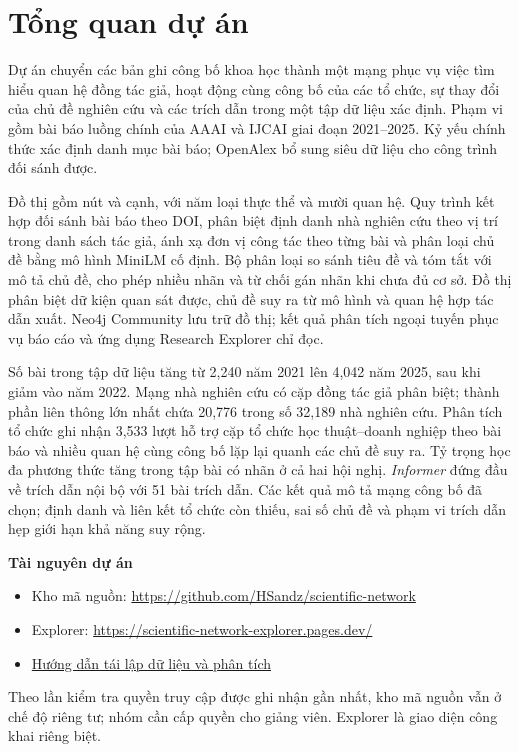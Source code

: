 \chapter*{Tổng quan dự án}
Dự án chuyển các bản ghi công bố khoa học thành một mạng phục vụ việc tìm hiểu
quan hệ đồng tác giả, hoạt động cùng công bố của các tổ chức, sự thay đổi của
chủ đề nghiên cứu và các trích dẫn trong một tập dữ liệu xác định. Phạm vi gồm
\Papers{} bài báo luồng chính của AAAI và IJCAI giai đoạn 2021--2025. Kỷ yếu
chính thức xác định danh mục bài báo; OpenAlex bổ sung siêu dữ liệu cho
\MatchedWorks{} công trình đối sánh được.

Đồ thị gồm \TotalNodes{} nút và
\TotalEdges{} cạnh, với năm loại thực thể và mười quan hệ. Quy trình kết hợp
đối sánh bài báo theo DOI, phân biệt định danh nhà nghiên cứu theo vị trí trong
danh sách tác giả, ánh xạ đơn vị công tác theo từng bài và phân loại chủ đề bằng
mô hình MiniLM cố định. Bộ phân loại so sánh tiêu đề và tóm tắt với mô tả chủ đề,
cho phép nhiều nhãn và từ chối gán nhãn khi chưa đủ cơ sở. Đồ thị phân biệt dữ
kiện quan sát được, chủ đề suy ra từ mô hình và quan hệ hợp tác dẫn xuất. Neo4j
Community lưu trữ đồ thị; kết quả phân tích ngoại tuyến phục vụ báo cáo và ứng
dụng Research Explorer chỉ đọc.

Số bài trong tập dữ liệu tăng từ 2,240 năm 2021 lên 4,042 năm 2025, sau khi giảm
vào năm 2022. Mạng nhà nghiên cứu có \CoauthorPairs{} cặp đồng tác giả phân biệt;
thành phần liên thông lớn nhất chứa 20,776 trong số 32,189 nhà nghiên cứu.
Phân tích tổ chức ghi nhận 3,533 lượt hỗ trợ cặp tổ chức học thuật--doanh nghiệp
theo bài báo và nhiều quan hệ cùng công bố lặp lại quanh các chủ đề suy ra.
Tỷ trọng học đa phương thức tăng trong tập bài có nhãn ở cả hai hội nghị.
\emph{Informer} đứng đầu về trích dẫn nội bộ với 51 bài trích dẫn. Các kết quả
mô tả mạng công bố đã chọn; định danh và liên kết tổ chức còn thiếu, sai số chủ
đề và phạm vi trích dẫn hẹp giới hạn khả năng suy rộng.

\textbf{Tài nguyên dự án}
\begin{itemize}
\item Kho mã nguồn: \url{https://github.com/HSandz/scientific-network}
\item Explorer: \url{https://scientific-network-explorer.pages.dev/}
\item \href{https://github.com/HSandz/scientific-network/blob/main/docs/reproduce-remediation-v4.md}{Hướng dẫn tái lập dữ liệu và phân tích}
\end{itemize}
Theo lần kiểm tra quyền truy cập được ghi nhận gần nhất, kho mã nguồn vẫn ở chế
độ riêng tư; nhóm cần cấp quyền cho giảng viên. Explorer là giao diện công khai
riêng biệt.
